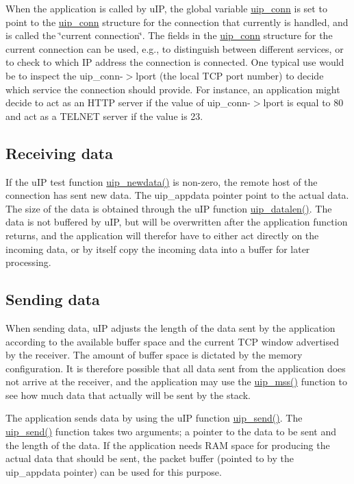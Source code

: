 When the application is called by u\-IP, the global variable \hyperlink{a00028}{uip\_\-conn} is set to point to the \hyperlink{a00028}{uip\_\-conn} structure for the connection that currently is handled, and is called the \char`\"{}current connection\char`\"{}. The fields in the \hyperlink{a00028}{uip\_\-conn} structure for the current connection can be used, e.g., to distinguish between different services, or to check to which IP address the connection is connected. One typical use would be to inspect the uip\_\-conn-$>$lport (the local TCP port number) to decide which service the connection should provide. For instance, an application might decide to act as an HTTP server if the value of uip\_\-conn-$>$lport is equal to 80 and act as a TELNET server if the value is 23.\hypertarget{main_recvdata}{}\subsection{Receiving data}\label{main_recvdata}
If the u\-IP test function \hyperlink{a00064_g26a14b8dae3f861830af9e7cf1e03725}{uip\_\-newdata()} is non-zero, the remote host of the connection has sent new data. The uip\_\-appdata pointer point to the actual data. The size of the data is obtained through the u\-IP function \hyperlink{a00064_g1a1bc437c09ddef238abab41d77c3177}{uip\_\-datalen()}. The data is not buffered by u\-IP, but will be overwritten after the application function returns, and the application will therefor have to either act directly on the incoming data, or by itself copy the incoming data into a buffer for later processing.\hypertarget{main_senddata}{}\subsection{Sending data}\label{main_senddata}
When sending data, u\-IP adjusts the length of the data sent by the application according to the available buffer space and the current TCP window advertised by the receiver. The amount of buffer space is dictated by the memory configuration. It is therefore possible that all data sent from the application does not arrive at the receiver, and the application may use the \hyperlink{a00064_gb5fecbc62edd128012cea0f47b57ab9f}{uip\_\-mss()} function to see how much data that actually will be sent by the stack.

The application sends data by using the u\-IP function \hyperlink{a00064_gb59415b2801e568f52bc1d86ef10e159}{uip\_\-send()}. The \hyperlink{a00064_gb59415b2801e568f52bc1d86ef10e159}{uip\_\-send()} function takes two arguments; a pointer to the data to be sent and the length of the data. If the application needs RAM space for producing the actual data that should be sent, the packet buffer (pointed to by the uip\_\-appdata pointer) can be used for this purpose.

